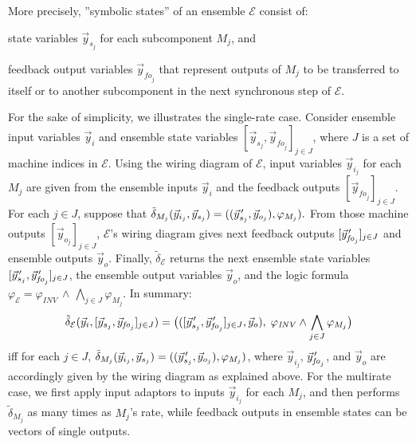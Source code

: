 \documentclass{sig-alternate}
\newcommand{\pvec}[1]{\vec{#1}\mkern2mu\vphantom{#1}} %
\begin{document}
More precisely, 
''symbolic states'' of an ensemble $\mathcal{E}$
consist of:
\begin{inparaenum}[(i)]
	\item state variables $\vec{y}_{s_j}$ for each subcomponent $M_j$,
	and
	\item feedback output variables $\vec{y}_{\mathit{fo}_{j}}$
that represent outputs of $M_j$ to be transferred to itself or 
to another subcomponent  in the next synchronous step of $\mathcal{E}$.
\end{inparaenum}
For the sake of simplicity,
we illustrates the single-rate case.
%
Consider ensemble input variables $\vec{y}_{i}$
and ensemble state variables $[\vec{y}_{s_j}, \vec{y}_{\mathit{fo}_{j}}]_{j \in J}$,
where $J$ is a set of machine indices in $\mathcal{E}$.
Using the wiring diagram of $\mathcal{E}$,
input variables $\vec{y}_{i_j}$ for each $M_j$ are given
from the ensemble inputs $\vec{y}_{i}$ and the feedback outputs $[\vec{y}_{\mathit{fo}_{j}}]_{j \in J}$.
For each $j \in J$, suppose that
$
\tilde{\delta}_{M_j}(\vec{y}_{i_j}, \vec{y}_{s_j})
=
((\pvec{y}_{\!s_j}', \pvec{y}_{\!o_j}), \varphi_{M_j}).
$
From those machine outputs $[\vec{y}_{\mathit{o}_j}]_{j \in J}$,
$\mathcal{E}$'s wiring diagram gives
next feedback outputs $[\pvec{y}_{\!\mathit{fo}_{j}}']_{j \in J}$
and ensemble outputs $\vec{y}_{o}$.
Finally, $\tilde{\delta}_\mathcal{E}$ returns 
the next ensemble state variables $[\pvec{y}_{\!s_j}', \pvec{y}_{\!\mathit{fo}_{j}}']_{j \in J}$,
the ensemble output variables $\vec{y}_{o}$,
and
the logic formula $\varphi_{\mathcal{E}} = \varphi_{\mathit{INV}} \,\wedge\, \bigwedge_{j \in J} \varphi_{M_j}$.
In summary:
\[
\tilde{\delta}_\mathcal{E}(\vec{y}_{i},  [\vec{y}_{s_j}, \vec{y}_{\mathit{fo}_{j}}]_{j \in J})
=
\big(([\pvec{y}_{\!s_j}', \pvec{y}_{\!\mathit{fo}_{j}}']_{j \in J}, \vec{y}_{o}),\;
\varphi_{\mathit{INV}}
\wedge
\bigwedge_{j \in J} \varphi_{M_j}\big)
\]
iff for each $j \in J$,
$\tilde{\delta}_{M_j}(\vec{y}_{i_j}, \vec{y}_{s_j})
=
((\pvec{y}_{\!s_j}', \pvec{y}_{\!o_j}), \varphi_{M_j})$,
where $\vec{y}_{i_j}$, $\pvec{y}_{\!\mathit{fo}_{j}}'$, and $\vec{y}_{o}$
are accordingly given by the wiring diagram
as explained above.
For the multirate case, we first apply input adaptors to inputs $\vec{y}_{i_j}$ for each $M_j$,
and then performs $\tilde{\delta}_{M_j}$
as many times as $M_j$'s rate,
while feedback outputs in ensemble states can be vectors of single outputs.
\end{document}
